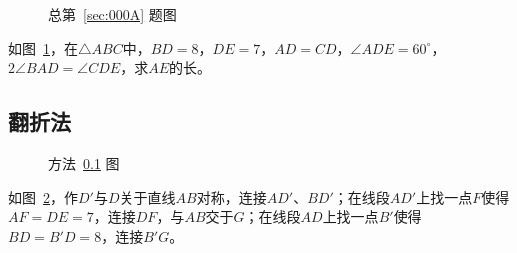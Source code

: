 

\begin{figure}[htbp]
  \centering {}
  \caption{总第~\ref{sec:000A} 题图} \label{fig:000A}
\end{figure}

如图~\ref{fig:000A}，在$\triangle ABC$中，$BD = 8$，$DE = 7$，$AD = CD$，$\angle ADE = 60^\circ$，$2\angle BAD = \angle CDE$，求$AE$的长。


\subsection{翻折法} \label{subsec:000A-fold}

\begin{figure}[htbp]
  \centering {}
  \caption{方法~\ref{subsec:000A-fold} 图} \label{fig:000A-fold}
\end{figure}

如图~\ref{fig:000A-fold}，作$D'$与$D$关于直线$AB$对称，连接$AD'$、$BD'$；在线段$AD'$上找一点$F$使得$AF = DE = 7$，连接$DF$，与$AB$交于$G$；在线段$AD$上找一点$B'$使得$BD = B'D = 8$，连接$B'G$。

